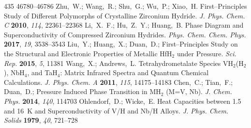 \documentclass[12pt,letterpaper,oneside]{article}
\begin{document}
\begin{mcitethebibliography}{435}
  46780--46786\relax
\mciteBstWouldAddEndPuncttrue
\mciteSetBstMidEndSepPunct{\mcitedefaultmidpunct}
{\mcitedefaultendpunct}{\mcitedefaultseppunct}\relax
\EndOfBibitem
{}
Zhu,~W.; Wang,~R.; Shu,~G.; Wu,~P.; Xiao,~H. First--Principles Study of
  Different Polymorphs of Crystalline Zirconium Hydride. \emph{J. Phys. Chem.
  C} \textbf{2010}, \emph{114}, 22361--22368\relax
\mciteBstWouldAddEndPuncttrue
\mciteSetBstMidEndSepPunct{\mcitedefaultmidpunct}
{\mcitedefaultendpunct}{\mcitedefaultseppunct}\relax
\EndOfBibitem
{}
Li,~X.~F.; Hu,~Z.~Y.; Huang,~B. Phase Diagram and Superconductivity of
  Compressed Zirconium Hydrides. \emph{Phys. Chem. Chem. Phys.} \textbf{2017},
  \emph{19}, 3538--3543\relax
\mciteBstWouldAddEndPuncttrue
\mciteSetBstMidEndSepPunct{\mcitedefaultmidpunct}
{\mcitedefaultendpunct}{\mcitedefaultseppunct}\relax
\EndOfBibitem
{}
Liu,~Y.; Huang,~X.; Duan,~D.; 
  First--Principles Study on the Structural and Electronic Properties of
  Metallic HfH$_2$ under Pressure. \emph{Sci. Rep.} \textbf{2015}, \emph{5},
  11381\relax
\mciteBstWouldAddEndPuncttrue
\mciteSetBstMidEndSepPunct{\mcitedefaultmidpunct}
{\mcitedefaultendpunct}{\mcitedefaultseppunct}\relax
\EndOfBibitem
{}
Wang,~X.; Andrews,~L. Tetrahydrometalate Species VH$_2$(H$_2$), NbH$_4$, and
  TaH$_4$: Matrix Infrared Spectra and Quantum Chemical Calculations. \emph{J.
  Phys. Chem. A} \textbf{2011}, \emph{115}, 14175--14183\relax
\mciteBstWouldAddEndPuncttrue
\mciteSetBstMidEndSepPunct{\mcitedefaultmidpunct}
{\mcitedefaultendpunct}{\mcitedefaultseppunct}\relax
\EndOfBibitem
{}
Chen,~C.; Tian,~F.; Duan,~D.;   Pressure Induced
  Phase Transition in MH$_2$ (M=V, Nb). \emph{J. Chem. Phys.} \textbf{2014},
  \emph{140}, 114703\relax
\mciteBstWouldAddEndPuncttrue
\mciteSetBstMidEndSepPunct{\mcitedefaultmidpunct}
{\mcitedefaultendpunct}{\mcitedefaultseppunct}\relax
\EndOfBibitem
{}
Ohlendorf,~D.; Wicke,~E. Heat Capacities between 1.5 and 16~K and
  Superconductivity of V/H and Nb/H Alloys. \emph{J. Phys. Chem. Solids}
  \textbf{1979}, \emph{40}, 721--728\relax
\mciteBstWouldAddEndPuncttrue
\mciteSetBstMidEndSepPunct{\mcitedefaultmidpunct}

\end{mcitethebibliography}
\end{document}
